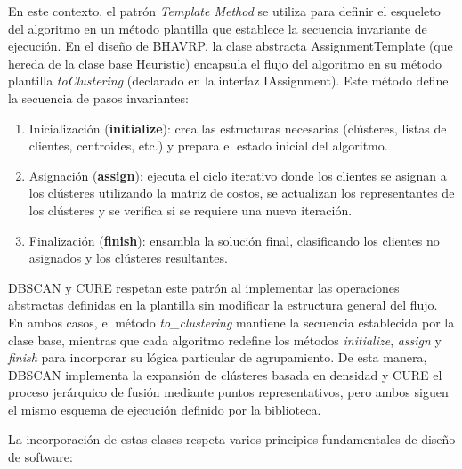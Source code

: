 En este contexto, el patr\'on \textit{Template Method} se utiliza para definir el esqueleto del algoritmo en un m\'etodo plantilla que establece la secuencia invariante de ejecuci\'on. En el dise\~no de BHAVRP, la clase abstracta AssignmentTemplate (que hereda de la clase base Heuristic) encapsula el flujo del algoritmo en su m\'etodo plantilla \textit{toClustering} (declarado en la interfaz IAssignment). Este m\'etodo define la secuencia de pasos invariantes:

\begin{enumerate}
  \item Inicializaci\'on (\textbf{initialize}): crea las estructuras necesarias (cl\'usteres, listas de clientes, centroides, etc.) y prepara el estado inicial del algoritmo.
  \item Asignaci\'on (\textbf{assign}): ejecuta el ciclo iterativo donde los clientes se asignan a los cl\'usteres utilizando la matriz de costos, se actualizan los representantes de los cl\'usteres y se verifica si se requiere una nueva iteraci\'on.
  \item Finalizaci\'on (\textbf{finish}): ensambla la soluci\'on final, clasificando los clientes no asignados y los cl\'usteres resultantes.
\end{enumerate}

DBSCAN y CURE respetan este patr\'on al implementar las operaciones abstractas definidas en la plantilla sin modificar la estructura general del flujo. En ambos casos, el m\'etodo \textit{to\_clustering} mantiene la secuencia establecida por la clase base, mientras que cada algoritmo redefine los m\'etodos \textit{initialize}, \textit{assign} y \textit{finish} para incorporar su l\'ogica particular de agrupamiento. De esta manera, DBSCAN implementa la expansi\'on de cl\'usteres basada en densidad y CURE el proceso jer\'arquico de fusi\'on mediante puntos representativos, pero ambos siguen el mismo esquema de ejecuci\'on definido por la biblioteca.

La incorporaci\'on de estas clases respeta varios principios fundamentales de dise\~no de software:

